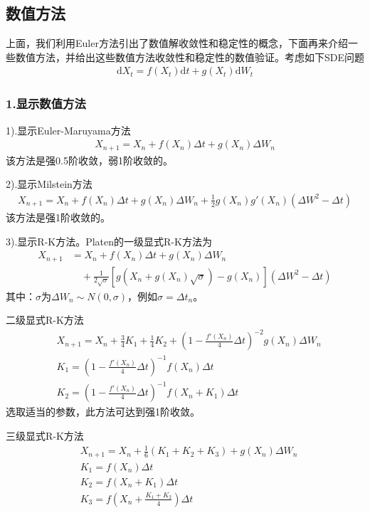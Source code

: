     \subsection{数值方法}
        \label{subsec:数值方法}
        \par
        上面，我们利用Euler方法引出了数值解收敛性和稳定性的概念，下面再来介绍一些数值方法，并给出这些数值方法收敛性和稳定性的数值验证。考虑如下SDE问题
        \begin{align*}
            \mathrm{d}X_t = f(X_t) \mathrm{d}t + g(X_t)\mathrm{d}W_t
        \end{align*}
        \subsubsection{1.显示数值方法}
            \par
            1).显示Euler-Maruyama方法
            \begin{align*}
            X_{n+1} = X_n +f(X_n)\Delta t + g(X_n)\Delta W_n
            \end{align*}
            该方法是强0.5阶收敛，弱1阶收敛的。
            \par
            2).显示Milstein方法
            \begin{align*}
            X_{n+1} = X_n +f(X_n)\Delta t + g(X_n)\Delta W_n + \frac 12 g(X_n)g'(X_n)(\Delta W^2 - \Delta t)
            \end{align*}
            该方法是强1阶收敛的。
            \par
            3).显示R-K方法。Platen的一级显式R-K方法为
            \begin{align*}
            X_{n+1} &= X_n + f(X_n)\Delta t + g(X_n)\Delta W_n \\
            &\quad + \frac{1}{2\sqrt{\sigma}}\left[ g(X_n+ g(X_n)\sqrt{\sigma}) - g(X_n) \right](\Delta W^2 - \Delta t)
            \end{align*}
            其中：$\sigma$为$\Delta W_n \sim N(0,\sigma)$，例如$\sigma = \Delta t_n$。
            \par
            二级显式R-K方法
            \begin{align*}
                &X_{n+1} = X_n +\frac 34 K_1+ \frac 14 K_2 + \left( 1-\frac{f'(X_n)}{4} \Delta t \right)^{-2} g(X_n)\Delta W_n\\
                &K_1 = \left( 1-\frac{f'(X_n)}{4} \Delta t \right)^{-1}f(X_n)\Delta t\\
                &K_2 = \left( 1-\frac{f'(X_n)}{4} \Delta t \right)^{-1}f(X_n + K_1)\Delta t
            \end{align*}
            选取适当的参数，此方法可达到强1阶收敛。
            \par
            三级显式R-K方法
            \begin{align*}
                &X_{n+1} = X_n + \frac 16(K_1 +K_2 +K_3)+g(X_n)\Delta W_n\\
                &K_1 = f(X_n)\Delta t\\
                &K_2 = f(X_n+K_1)\Delta t\\
                &K_3 = f\left(X_n + \frac{K_1 +K_2}{4}\right)\Delta t
            \end{align*}

